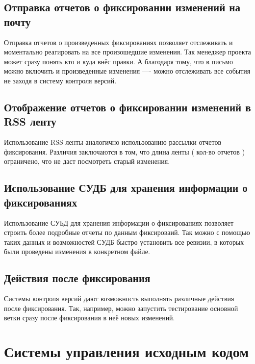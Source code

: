 \subsection{ Отправка отчетов о фиксировании изменений на почту } \label{sect3_3_2}

Отправка отчетов о произведенных фиксированиях позволяет отслеживать и моментально реагировать на все произошедшие изменения. Так менеджер проекта может сразу понять кто и куда внёс правки. А благодаря тому, что в письмо можно включить и произведенные изменения ---- можно отслеживать все события не заходя в систему контроля версий.

\subsection{ Отображение отчетов о фиксировании изменений в RSS ленту } \label{sect3_3_3}

 Использование RSS ленты аналогично использованию рассылки отчетов фиксирования.  Различия заключаются в том, что длина ленты ( кол-во отчетов ) ограничено, что не даст посмотреть старый изменения.
 
 
 \subsection{ Использование СУДБ для хранения информации о фиксированиях } \label{sect3_3_4}

Использование СУБД для хранения информации о фиксированиях позволяет строить более подробные отчеты по данным фиксироваий. Так можно с помощью таких данных и возможностей СУДБ быстро установить все ревизии, в которых были проведены изменения в конкретном файле.

 \subsection{ Действия после фиксирования } \label{sect3_3_5}
 
 Системы контроля версий дают возможность выполнять различные действия после фиксирования. Так, например, можно запустить тестирование основной ветки сразу после фиксирования в неё новых изменений.
 
 
\section{ Системы управления исходным кодом } \label{sect3_4}
 
